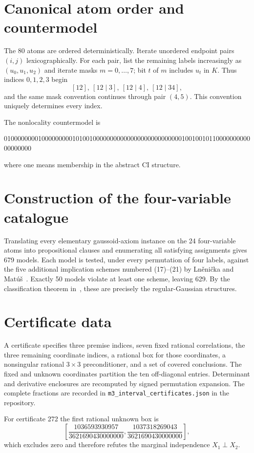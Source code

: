 \documentclass[10pt]{article}
\theoremstyle{definition}
\newcommand{\code}[1]{\texttt{#1}}
\begin{document}
\appendix
\section{Canonical atom order and countermodel}\label{app:atoms}

The 80 atoms are ordered deterministically.  Iterate unordered endpoint pairs $(i,j)$ lexicographically.  For each pair, list the remaining labels increasingly as $(u_0,u_1,u_2)$ and iterate masks $m=0,\ldots,7$; bit $t$ of $m$ includes $u_t$ in $K$.  Thus indices $0,1,2,3$ begin
\[
 [12],\ [12\mid3],\ [12\mid4],\ [12\mid34],
\]
and the same mask convention continues through pair $(4,5)$.  This convention uniquely determines every index.

The nonlocality countermodel is
\begin{center}
\ttfamily\small
01000000001000000000101001000000000000000000000000001001001011000000000000000000
\end{center}
where one means membership in the abstract CI structure.

\section{Construction of the four-variable catalogue}\label{app:t4}

Translating every elementary gaussoid-axiom instance on the 24 four-variable atoms into propositional clauses and enumerating all satisfying assignments gives 679 models.  Each model is tested, under every permutation of four labels, against the five additional implication schemes numbered (17)--(21) by Ln\v{e}ni\v{c}ka and Mat\'u\v{s}~\cite{LM2007}.  Exactly 50 models violate at least one scheme, leaving 629.  By the classification theorem in~\cite{LM2007}, these are precisely the regular-Gaussian structures.

\section{Certificate data}\label{app:cert}

A certificate specifies three premise indices, seven fixed rational correlations, the three remaining coordinate indices, a rational box for those coordinates, a nonsingular rational $3\times3$ preconditioner, and a set of covered conclusions.  The fixed and unknown coordinates partition the ten off-diagonal entries.  Determinant and derivative enclosures are recomputed by signed permutation expansion.  The complete fractions are recorded in \code{m3\_interval\_certificates.json} in the repository.

For certificate 272 the first rational unknown box is
\[
 \left[\frac{1036593930957}{3621690430000000},
       \frac{1037318269043}{3621690430000000}\right],
\]
which excludes zero and therefore refutes the marginal independence $X_1\perp X_2$.



\end{document}

